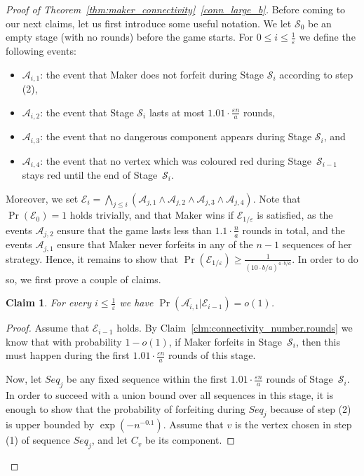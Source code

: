 \documentclass[11pt, a4paper]{article}
\numberwithin{equation}{section}
\numberwithin{figure}{section}
\newtheorem{claim}[theorem]{Claim}
\newcommand{\Prob}{\operatorname{Pr}}
\begin{document}
\begin{proof}[Proof of Theorem~\ref{thm:maker_connectivity}~\ref{conn_large_b}]
Before coming to our next claims, let us first introduce some useful notation.
We let $\mathcal{S}_0$ be an empty stage
(with no rounds) before the game starts.
For $0\leq i\leq \frac{1}{\varepsilon}$ we define the following events: 
\begin{itemize}
\item $\mathcal{A}_{i,1}$: the event that Maker does not forfeit during Stage 
$\mathcal{S}_{i}$ according to step (2),
\item $\mathcal{A}_{i,2}$: the event that Stage $\mathcal{S}_{i}$ lasts at most $1.01\cdot \frac{\varepsilon n}{a}$ rounds,
\item $\mathcal{A}_{i,3}$: the event that no dangerous component appears during Stage $\mathcal{S}_{i}$, and
\item $\mathcal{A}_{i,4}$: the event that no vertex which was coloured red during Stage~$\mathcal{S}_{i-1}$ stays red until the end of Stage~$\mathcal{S}_{i}$.
\end{itemize}
Moreover, we set
$\mathcal{E}_i = \bigwedge_{j \leq i} (\mathcal{A}_{j,1} \land \mathcal{A}_{j,2} \land \mathcal{A}_{j,3} \land \mathcal{A}_{j,4})$.
Note that 
$\Prob(\mathcal{E}_0)=1$ holds trivially,
and that Maker wins if 
$\mathcal{E}_{1/\varepsilon}$ is satisfied,
as the events $\mathcal{A}_{j,2}$ ensure that the game lasts less than $1.1\cdot \frac{n}{a}$ rounds in total,
and the events $\mathcal{A}_{j,1}$ ensure that Maker never forfeits in any of the $n-1$ sequences of her strategy.
Hence, it remains to show that
$\Prob(\mathcal{E}_{1/\varepsilon})\geq \frac{1}{(10\cdot b/a)^{4\cdot b/a}}$.
In order to do so, we first prove a couple of claims.


\begin{claim}\label{claim:Ai1}
For every $i\leq \frac{1}{\varepsilon}$ we have
$\Prob(\overline{\mathcal{A}_{i,1}}|\mathcal{E}_{i-1})
=o(1)$.
\end{claim}

\begin{proof}
Assume that $\mathcal{E}_{i-1}$ holds.
By Claim~\ref{clm:connectivity_number.rounds}
we know that
with probability $1-o(1)$,
if Maker forfeits in Stage~$\mathcal{S}_{i}$,
then this must happen during the first 
$1.01\cdot \frac{\varepsilon n}{a}$ rounds of this stage. 

Now, let $Seq_j$ be any fixed sequence within the first 
$1.01\cdot \frac{\varepsilon n}{a}$ rounds
of Stage~$\mathcal{S}_{i}$. 
In order to succeed with a union bound over all
sequences in this stage, it is enough to show
that the probability of forfeiting during $Seq_j$ because of step (2) is upper bounded by $\exp(-n^{-0.1})$. Assume that $v$ is the vertex chosen in step (1) of sequence $Seq_j$, and let $C_v$ be its component. 


\end{proof}
\end{proof}
\end{document}
